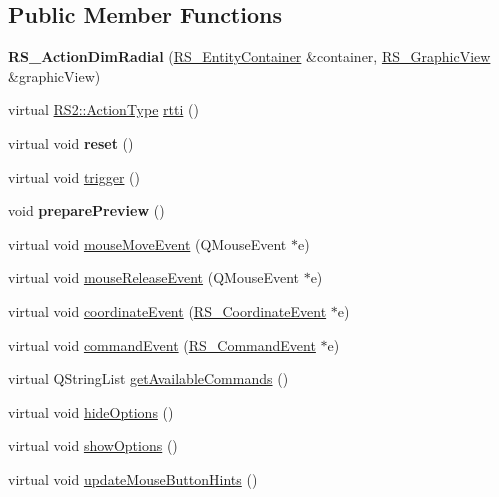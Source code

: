 \subsection*{Public Member Functions}
\begin{DoxyCompactItemize}
\item 
\hypertarget{classRS__ActionDimRadial_a991a45240e89b36b31b667f87ab2e686}{{\bfseries R\-S\-\_\-\-Action\-Dim\-Radial} (\hyperlink{classRS__EntityContainer}{R\-S\-\_\-\-Entity\-Container} \&container, \hyperlink{classRS__GraphicView}{R\-S\-\_\-\-Graphic\-View} \&graphic\-View)}\label{classRS__ActionDimRadial_a991a45240e89b36b31b667f87ab2e686}

\item 
virtual \hyperlink{classRS2_afe3523e0bc41fd637b892321cfc4b9d7}{R\-S2\-::\-Action\-Type} \hyperlink{classRS__ActionDimRadial_a2e0defcfb01aa46cb752b5cad8a56cbd}{rtti} ()
\item 
\hypertarget{classRS__ActionDimRadial_a0e13f859de6c04b99933b8820ebc620b}{virtual void {\bfseries reset} ()}\label{classRS__ActionDimRadial_a0e13f859de6c04b99933b8820ebc620b}

\item 
virtual void \hyperlink{classRS__ActionDimRadial_a2be730b44fcb690e4265d280b2ff77af}{trigger} ()
\item 
\hypertarget{classRS__ActionDimRadial_a7246474fb145fc1e201b39eae1efca73}{void {\bfseries prepare\-Preview} ()}\label{classRS__ActionDimRadial_a7246474fb145fc1e201b39eae1efca73}

\item 
virtual void \hyperlink{classRS__ActionDimRadial_a7ae860a2a2661c3aaaada5036ecd2e35}{mouse\-Move\-Event} (Q\-Mouse\-Event $\ast$e)
\item 
virtual void \hyperlink{classRS__ActionDimRadial_a2118f288cd570df06c20d7f35037666a}{mouse\-Release\-Event} (Q\-Mouse\-Event $\ast$e)
\item 
virtual void \hyperlink{classRS__ActionDimRadial_a770792d7cad20b4a6b7f60ea07efd8a8}{coordinate\-Event} (\hyperlink{classRS__CoordinateEvent}{R\-S\-\_\-\-Coordinate\-Event} $\ast$e)
\item 
virtual void \hyperlink{classRS__ActionDimRadial_a0bc44e96750c74e1cb6fe188cf4bb127}{command\-Event} (\hyperlink{classRS__CommandEvent}{R\-S\-\_\-\-Command\-Event} $\ast$e)
\item 
virtual Q\-String\-List \hyperlink{classRS__ActionDimRadial_a90c640c4c6d8046a6e451c7fdc2676aa}{get\-Available\-Commands} ()
\item 
virtual void \hyperlink{classRS__ActionDimRadial_a8349cd1e86fb30e56ba89cb09a140537}{hide\-Options} ()
\item 
virtual void \hyperlink{classRS__ActionDimRadial_a6c48c5e71f1765d6c1391339f3115ebe}{show\-Options} ()
\item 
virtual void \hyperlink{classRS__ActionDimRadial_aa8d0751fdaaf45c8a49c8364989f4831}{update\-Mouse\-Button\-Hints} ()
\end{DoxyCompactItemize}
